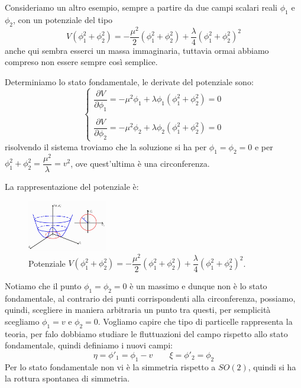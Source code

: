 Consideriamo un altro esempio, sempre a partire da due campi scalari reali $\phi_1$ e $\phi_2$, con un potenziale del tipo
\begin{equation}
    V(\phi_1^2+\phi_2^2)=-\dfrac{\mu^2}{2}(\phi_1^2+\phi_2^2)+\dfrac{\lambda}{4}(\phi_1^2+\phi_2^2)^2
\end{equation}
anche qui sembra esserci un massa immaginaria, tuttavia ormai abbiamo compreso non essere sempre così semplice.

Determiniamo lo stato fondamentale, le derivate del potenziale sono:
\begin{equation}
    \begin{cases}
        \dfrac{\partial V}{\partial\phi_1}=-\mu^2\phi_1+\lambda\phi_1(\phi_1^2+\phi_2^2)=0\\
        \\
        \dfrac{\partial V}{\partial\phi_2}=-\mu^2\phi_2+\lambda\phi_2(\phi_1^2+\phi_2^2)=0
    \end{cases}
\end{equation}
risolvendo il sistema troviamo che la soluzione si ha per $\phi_1=\phi_2=0$ e per $\phi_1^2+\phi_2^2=\dfrac{\mu^2}{\lambda}=v^2$, ove quest'ultima è una circonferenza.

La rappresentazione del potenziale è: 
\begin{figure}[H]
    \centering
    \includegraphics[width=0.31\textwidth]{Immagini/Pot4.jpg}
    \caption{Potenziale $  V(\phi_1^2+\phi_2^2)=-\dfrac{\mu^2}{2}(\phi_1^2+\phi_2^2)+\dfrac{\lambda}{4}(\phi_1^2+\phi_2^2)^2$.}
    \label{fig:pot4}
\end{figure}
Notiamo che il punto $\phi_1=\phi_2=0$ è un massimo e dunque non è lo stato fondamentale, al contrario dei punti corrispondenti alla circonferenza, possiamo, quindi, scegliere in maniera arbitraria un punto tra questi, per semplicità scegliamo $\phi_1=v$ e $\phi_2=0$.
Vogliamo capire che tipo di particelle rappresenta la teoria, per falo dobbiamo studiare le fluttuazioni del campo rispetto allo stato fondamentale, quindi definiamo
i nuovi campi:
\begin{equation}
 \eta=\phi'_1=\phi_1-v\qquad\xi=\phi'_2=\phi_2
\end{equation}
Per lo stato fondamentale non vi è la simmetria rispetto a $SO(2)$, quindi si ha la rottura spontanea di simmetria.

